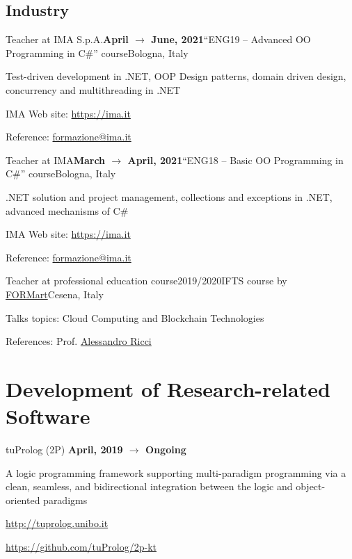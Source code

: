\subsection*{Industry}

\begin{activity}{Teacher at IMA S.p.A.}{\textbf{April $\rightarrow$ June, 2021}}{``ENG19 -- Advanced OO Programming in C\#'' course}{Bologna, Italy}
    \item Test-driven development in .NET, OOP Design patterns, domain driven design, concurrency and multithreading in .NET
    \item IMA Web site: \url{https://ima.it}
    \item Reference: \href{mailto:formazione@ima.it}{formazione@ima.it}
\end{activity}

\begin{activity}{Teacher at IMA}{\textbf{March $\rightarrow$ April, 2021}}{``ENG18 -- Basic OO Programming in C\#'' course}{Bologna, Italy}
    \item .NET solution and project management, collections and exceptions in .NET, advanced mechanisms of C\#
    \item IMA Web site: \url{https://ima.it}
    \item Reference: \href{mailto:formazione@ima.it}{formazione@ima.it}
\end{activity}

\begin{activity}{Teacher at professional education course}{2019/2020}{IFTS course by \href{http://www.formart.it/home}{FORMart}}{Cesena, Italy}
    \item Talks topics: Cloud Computing and Blockchain Technologies
    \item References:  Prof. \href{mailto:a.ricci@unibo.it}{Alessandro Ricci}
\end{activity}


\section*{Development of Research-related Software}

\begin{activity}{\textsf{tu}Prolog (2P) \cite{cco-softwarex-2021-2pkt}}{\textbf{April, 2019 $\rightarrow$ Ongoing}}{}{}
    \item A logic programming framework supporting multi-paradigm programming via a clean, seamless, and bidirectional integration between the logic and object-oriented paradigms
    \item \url{http://tuprolog.unibo.it}
    \item \url{https://github.com/tuProlog/2p-kt}
\end{activity}


